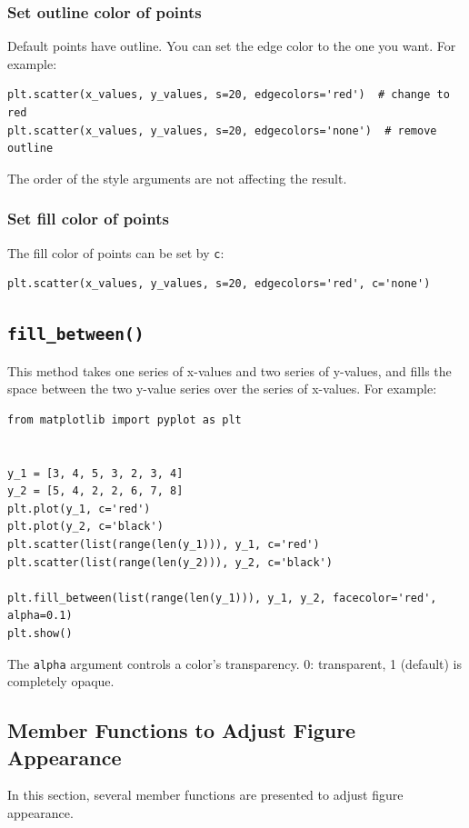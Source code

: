 \documentclass[12pt]{book}
\begin{document}
\subsubsection{Set outline color of points}
\label{sec:org69b6f7f}
Default points have outline. You can set the edge color to the one you want. For example:
\begin{verbatim}
plt.scatter(x_values, y_values, s=20, edgecolors='red')  # change to red
plt.scatter(x_values, y_values, s=20, edgecolors='none')  # remove outline
\end{verbatim}
The order of the style arguments are not affecting the result.

\subsubsection{Set fill color of points}
\label{sec:org565347c}
The fill color of points can be set by \texttt{c}:
\begin{verbatim}
plt.scatter(x_values, y_values, s=20, edgecolors='red', c='none')
\end{verbatim}

\subsection{\texttt{fill\_between()}}
\label{sec:org50eab6f}
This method takes one series of x-values and two series of y-values, and fills the space between the two y-value series over the series of x-values. For example:
\begin{verbatim}
from matplotlib import pyplot as plt


y_1 = [3, 4, 5, 3, 2, 3, 4]
y_2 = [5, 4, 2, 2, 6, 7, 8]
plt.plot(y_1, c='red')
plt.plot(y_2, c='black')
plt.scatter(list(range(len(y_1))), y_1, c='red')
plt.scatter(list(range(len(y_2))), y_2, c='black')

plt.fill_between(list(range(len(y_1))), y_1, y_2, facecolor='red', alpha=0.1)
plt.show()
\end{verbatim}

The \texttt{alpha} argument controls a color's transparency. 0: transparent, 1 (default) is completely opaque.

\subsection{Member Functions to Adjust Figure Appearance}
\label{sec:org0cbb87f}
In this section, several member functions are presented to adjust figure appearance.
\end{document}
